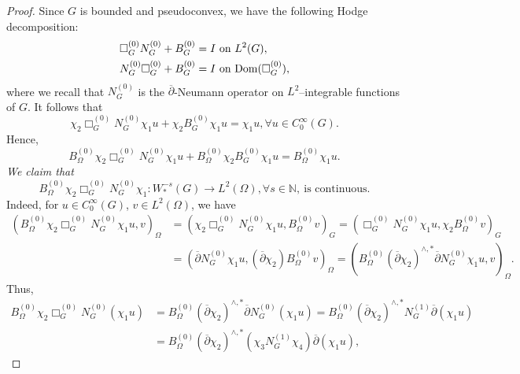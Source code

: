 \documentclass[a4paper,centertags,oneside,12pt]{amsart}
\numberwithin{equation}{section}
\begin{document}
\begin{proof}
Since $G$ is bounded and pseudoconvex, we have the following Hodge decomposition:
 \begin{equation*}
     \begin{split}&\Box_G^{(0)}N_{G}^{(0)}+B_{G}^{(0)}=I ~\text{on}~L^2(G),\\
     &N_{G}^{(0)}\Box_{G}^{(0)}+B_{G}^{(0)}=I~\text{on}~{\rm Dom}(\Box_{G}^{(0)}),
     \end{split}
 \end{equation*}
 where we recall that $N_{G}^{(0)}$ is the $\overline\partial$-Neumann operator on $L^2$--integrable functions of $G$.
It follows that 
\begin{equation*}
\chi_2\Box_{G}^{(0)}N_{G}^{(0)}\chi_1 u+\chi_2 B_{G}^{(0)}\chi_1 u=\chi_1 u, \forall u\in C_0^\infty(G).
\end{equation*}
Hence,
\begin{equation}\label{1-21-a1}
    B_\Omega^{(0)}\chi_2\Box_{G}^{(0)}N_{G}^{(0)}\chi_1 u+B_{\Omega}^{(0)}\chi_2 B_{G}^{(0)}\chi_1 u=B_\Omega^{(0)}\chi_1 u.
\end{equation}
{\it We claim that}
    \begin{equation}\label{1-21-a2}
        B_\Omega^{(0)}\chi_2\Box_{G}^{(0)}N_{G}^{(0)}\chi_1: W_\ast^{-s}(G)\rightarrow L^2(\Omega), \forall s\in\mathbb N, ~\text{is continuous}.
    \end{equation}
Indeed,
for $u\in C_0^\infty(G)$, $v\in L^2(\Omega)$, we have
    \begin{equation*}
        \begin{split}(B_\Omega^{(0)}\chi_2\Box_{G}^{(0)}N_{G}^{(0)}\chi_1 u, v)_{\Omega}&=(\chi_2\Box_{G}^{(0)}N_{G}^{(0)}\chi_1 u, B_\Omega^{(0)}v)_{G}=(\Box_{G}^{(0)}N_{G}^{(0)}\chi_1u,\chi_2 B_\Omega^{(0)}v)_{G}\\
        &=(\overline\partial N_{G}^{(0)}\chi_1 u, (\overline\partial \chi_2) B_\Omega^{(0)}v)_{\Omega}=(B_\Omega^{(0)}(\overline\partial\chi_2)^{\wedge, \ast}\overline\partial N_G^{(0)}\chi_1 u, v)_{\Omega}.
        \end{split}
    \end{equation*}
    Thus, \begin{equation*}
        \begin{split}
        B_\Omega^{(0)}\chi_2\Box_{G}^{(0)}N_{G}^{(0)}(\chi_1 u)&=B_\Omega^{(0)}(\overline\partial\chi_2)^{\wedge, \ast}\overline\partial N_G^{(0)}(\chi_1 u)=B_\Omega^{(0)}(\overline\partial\chi_2)^{\wedge, \ast}N_G^{(1)}\overline\partial(\chi_1 u)\\
        &=B_\Omega^{(0)}(\overline\partial\chi_2)^{\wedge, \ast}(\chi_3N_{G}^{(1)}\chi_4)\overline\partial(\chi_1 u),

\end{split}
\end{equation*}
\end{proof}
\end{document}
